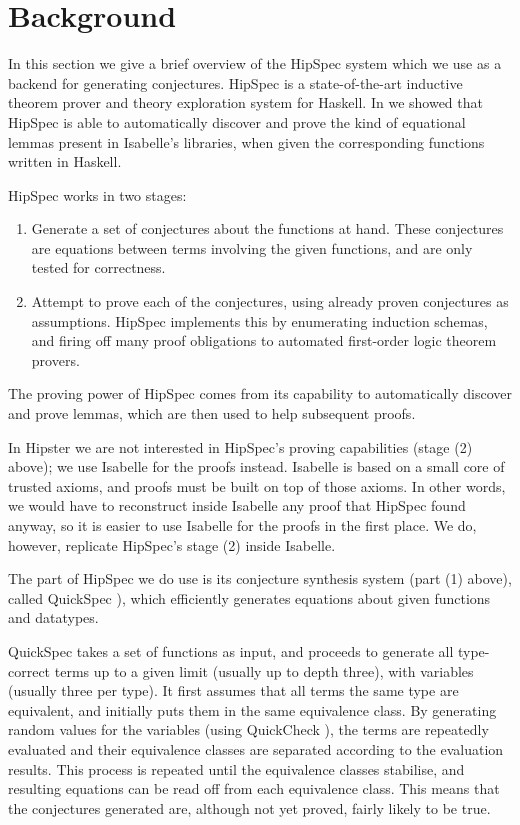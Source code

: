 \section{Background}
\label{sec:background}

In this section we give a brief overview of the HipSpec system which
we use as a backend for generating conjectures. HipSpec is a
state-of-the-art inductive theorem prover and theory exploration
system for Haskell. In \cite{hipspecCADE} we showed that HipSpec is
able to automatically discover and prove the kind of equational lemmas present in
Isabelle's libraries, when given the corresponding functions written in Haskell.

HipSpec works in two stages:
\begin{enumerate}
\item Generate a set of conjectures about the functions at hand. These conjectures are equations between terms involving the given functions, and are only tested for correctness.

\item Attempt to prove each of the conjectures, using already proven conjectures as assumptions. HipSpec implements this by enumerating induction schemas, and firing off many proof obligations to automated first-order logic theorem provers.
\end{enumerate}
The proving power of HipSpec comes from its capability to
automatically discover and prove lemmas, which are then used to help
subsequent proofs.

In Hipster we are not interested in HipSpec's
proving capabilities (stage (2) above); we use Isabelle for the proofs instead. Isabelle
is based on a small core of trusted axioms, and proofs must be built
on top of those axioms. In other words, we would have to reconstruct
inside Isabelle any proof that HipSpec found anyway, so it is easier
to use Isabelle for the proofs in the first place. We do, however,
replicate HipSpec's stage (2) inside Isabelle.

The part of HipSpec we do use
is its conjecture synthesis system (part (1) above), called QuickSpec \cite{quickspec}),
which efficiently generates equations about given functions and
datatypes.

QuickSpec takes a set of functions as input, and proceeds to generate all
type-correct terms up to a given limit (usually up to depth three), with
variables (usually three per type).  It first assumes that all terms the same
type are equivalent, and initially puts them in the same equivalence class.  By
generating random values for the variables (using QuickCheck \cite{quickcheck}), the terms are repeatedly evaluated and their equivalence
classes are separated according to the evaluation results.  This process is
repeated until the equivalence classes stabilise, and resulting equations can
be read off from each equivalence class.  This means that the conjectures
generated are, although not yet proved, fairly likely to be true.

